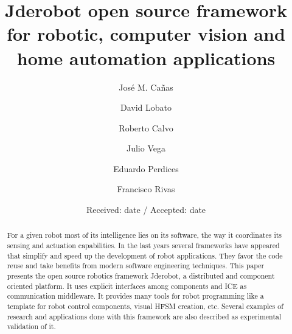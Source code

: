 \documentclass[twocolumn]{svjour3}          %
\begin{document}
\title{Jderobot open source framework for robotic, computer vision and home automation applications
}


\author{José M. Cañas \and David Lobato \and Roberto Calvo \and Julio Vega \and Eduardo Perdices \and Francisco Rivas}



\date{Received: date / Accepted: date}


\maketitle

\begin{abstract}
For a given robot most of its intelligence lies on its software, the way it coordinates its sensing and actuation capabilities. In the last years several frameworks have appeared that simplify and speed up the development of robot applications. They favor the code reuse and take benefits from modern software engineering techniques. This paper presents the open source robotics framework Jderobot, a distributed and component oriented platform. It uses explicit interfaces among components and ICE as communication middleware. It provides many tools for robot programming like a template for robot control components, visual HFSM creation, etc. Several examples of research and applications done with this framework are also described as experimental validation of it.
\end{abstract}
\end{document}

